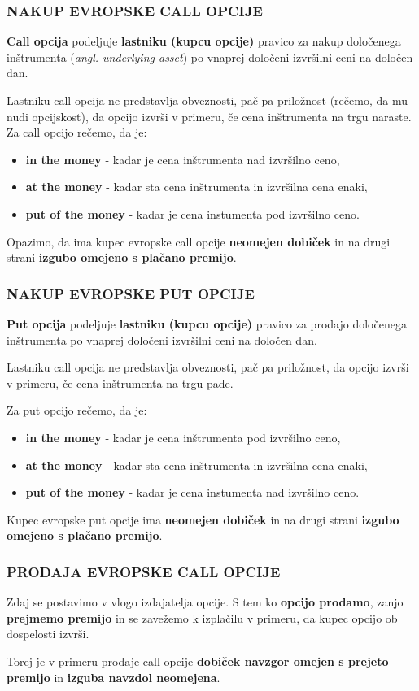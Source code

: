 \documentclass[10pt]{beamer}
\begin{document}
\begin{frame}
\frametitle{NAKUP EVROPSKE CALL OPCIJE}
\textbf{Call opcija} podeljuje \textbf{lastniku (kupcu opcije)} pravico
za nakup določenega inštrumenta (\emph{angl. underlying asset}) po
vnaprej določeni izvršilni ceni na določen dan. 

Lastniku call opcija ne predstavlja obveznosti, pač pa
priložnost (rečemo, da mu nudi opcijskost), da opcijo izvrši v primeru,
če cena inštrumenta na trgu naraste. Za call opcijo rečemo, da je:

\begin{itemize}
\item
  \textbf{in the money} - kadar je cena inštrumenta nad izvršilno ceno,
\item
  \textbf{at the money} - kadar sta cena inštrumenta in izvršilna cena
  enaki,
\item
  \textbf{put of the money} - kadar je cena instumenta pod izvršilno
  ceno.
\end{itemize}

Opazimo, da ima kupec evropske call opcije \textbf{neomejen dobiček} in
na drugi strani \textbf{izgubo omejeno s plačano premijo}.
\end{frame}


\begin{frame}
\frametitle{NAKUP EVROPSKE PUT OPCIJE}
\textbf{Put opcija} podeljuje \textbf{lastniku (kupcu opcije) } pravico
za prodajo določenega inštrumenta po vnaprej določeni izvršilni ceni na
določen dan. 

Lastniku call opcija ne predstavlja
obveznosti, pač pa priložnost, da opcijo
izvrši v primeru, če cena inštrumenta na trgu pade.

Za put opcijo rečemo, da je:

\begin{itemize}
\item
  \textbf{in the money} - kadar je cena inštrumenta pod izvršilno ceno,
\item
  \textbf{at the money} - kadar sta cena inštrumenta in izvršilna cena
  enaki,
\item
  \textbf{put of the money} - kadar je cena instumenta nad izvršilno
  ceno.
\end{itemize}

Kupec evropske put opcije ima \textbf{neomejen dobiček} in na drugi strani
\textbf{izgubo omejeno s plačano premijo}.
\end{frame}


\begin{frame}
\frametitle{PRODAJA EVROPSKE CALL OPCIJE}

Zdaj se postavimo v vlogo izdajatelja opcije. S tem ko \textbf{opcijo
prodamo}, zanjo \textbf{prejmemo premijo} in se zavežemo k izplačilu v
primeru, da kupec opcijo ob dospelosti izvrši. 

Torej je v primeru
prodaje call opcije \textbf{dobiček navzgor omejen s prejeto premijo} in
\textbf{izguba navzdol neomejena}.

\end{frame}
\end{document}
